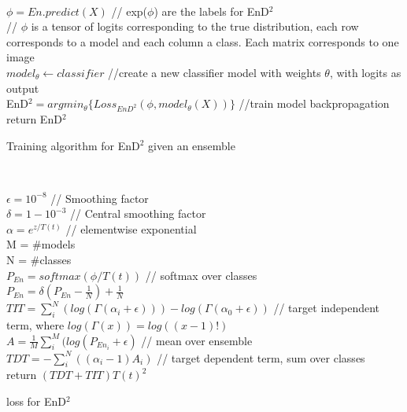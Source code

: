 \begin{algorithm}
     \\
    $\phi = En.predict(X)$ // exp($\phi$) are the labels for EnD$^2$  \\
    // $\phi$ is a tensor of logits corresponding to the true distribution, each row corresponds to a model and each column a class. Each matrix corresponds to one image \\
    $model_{\theta} \leftarrow classifier$ //create a new classifier model with weights $\theta$, with logits as output \\
    EnD$^2 = argmin_{\theta}\{Loss_{EnD^2}(\phi,model_{\theta}(X)) \}$ //train model backpropagation\\
    return EnD$^2$
    \caption{Training algorithm for EnD$^2$ given an ensemble}
    \label{alg:training}
    
\end{algorithm} \\
\begin{algorithm}
    $\epsilon = 10^{-8}$  // Smoothing factor\\
    $\delta = 1-10^{-3}$ // Central smoothing factor\\
    
    $\alpha = e^{z/T(t)}$ // elementwise exponential\\
    M = \#models \\
    N = \#classes \\
    $P_{En} = softmax(\phi/T(t))$ // softmax over classes\\
    $P_{En} = \delta(P_{En} - \frac{1}{N}) + \frac{1}{N}$\\
    $TIT = \sum_i^N(log(\Gamma(\alpha_i + \epsilon))) - log(\Gamma(
            \alpha_0 + \epsilon))  $ // target independent term, where $log(\Gamma(x)) = log((x - 1)!)$\\
    $A = \frac{1}{M}\sum^{M}_i(log(P_{En_i} + \epsilon)$ // mean over ensemble\\
    $TDT = -\sum_i^{N}((\alpha_i - 1) A_i)$  // target dependent term, sum over classes \\

    return $(TDT +TIT) T(t)^2$
    
    
    \label{alg:loss}
    \caption{loss for EnD$^2$}
    

\end{algorithm} 
\\


